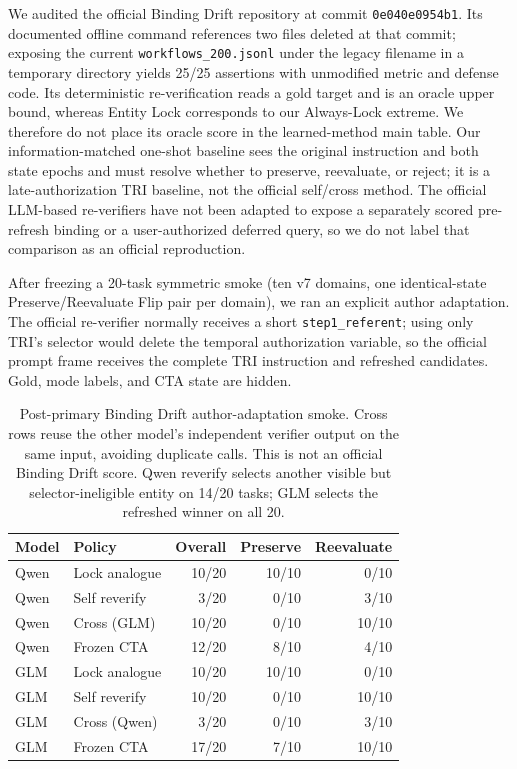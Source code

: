 \documentclass[10pt]{article}
\begin{document}
We audited the official Binding Drift repository at commit
\texttt{0e040e0954b1}. Its documented offline command references
two files deleted at that commit; exposing the current \texttt{workflows\_200.jsonl} under the
legacy filename in a temporary directory yields 25/25 assertions with unmodified metric and
defense code. Its deterministic re-verification reads a gold target and is an oracle upper bound,
whereas Entity Lock corresponds to our Always-Lock extreme. We therefore do not place its oracle
score in the learned-method main table. Our information-matched one-shot baseline sees the original
instruction and both state epochs and must resolve whether to preserve, reevaluate, or reject;
it is a late-authorization TRI baseline, not the official self/cross method.
The official LLM-based re-verifiers have not been adapted to expose a separately scored
pre-refresh binding or a user-authorized deferred query, so we do not label that comparison as an
official reproduction.

After freezing a 20-task symmetric smoke (ten v7 domains, one identical-state
Preserve/Reevaluate Flip pair per domain), we ran an explicit author adaptation. The official
re-verifier normally receives a short \texttt{step1\_referent}; using only TRI's selector would
delete the temporal authorization variable, so the official prompt frame receives the complete
TRI instruction and refreshed candidates. Gold, mode labels, and CTA state are hidden.
\begin{table}[h]
\centering
\scriptsize
\begin{tabular}{llrrr}
\toprule
Model & Policy & Overall & Preserve & Reevaluate \\
\midrule
Qwen & Lock analogue & 10/20 & 10/10 & 0/10 \\
Qwen & Self reverify & 3/20 & 0/10 & 3/10 \\
Qwen & Cross (GLM) & 10/20 & 0/10 & 10/10 \\
Qwen & Frozen CTA & 12/20 & 8/10 & 4/10 \\
GLM & Lock analogue & 10/20 & 10/10 & 0/10 \\
GLM & Self reverify & 10/20 & 0/10 & 10/10 \\
GLM & Cross (Qwen) & 3/20 & 0/10 & 3/10 \\
GLM & Frozen CTA & 17/20 & 7/10 & 10/10 \\
\bottomrule
\end{tabular}
\caption{Post-primary Binding Drift author-adaptation smoke. Cross rows reuse the other model's
independent verifier output on the same input, avoiding duplicate calls. This is not an official
Binding Drift score. Qwen reverify selects another visible but selector-ineligible entity on
14/20 tasks; GLM selects the refreshed winner on all 20.}
\end{table}
\end{document}
